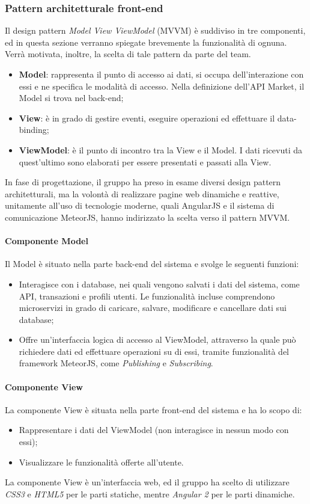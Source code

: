 \subsubsection{Pattern architetturale front-end}
Il design pattern \textit{Model View ViewModel} (MVVM) è suddiviso in tre componenti, ed in questa sezione verranno spiegate brevemente la funzionalità di ognuna. Verrà motivata, inoltre, la scelta di tale pattern da parte del team.

\begin{itemize}
	\item \textbf{Model}: rappresenta il punto di accesso ai dati, si occupa dell'interazione con essi e ne specifica le modalità di accesso. Nella definizione dell'API Market, il Model si trova nel back-end;
	\item \textbf{View}: è in grado di gestire eventi, eseguire operazioni ed effettuare il data-binding;
	\item \textbf{ViewModel}: è il punto di incontro tra la View e il Model. I dati ricevuti da quest’ultimo sono elaborati per essere presentati e passati alla View.
\end{itemize}

In fase di progettazione, il gruppo ha preso in esame diversi design pattern architetturali, ma la volontà di realizzare pagine web dinamiche e reattive, unitamente all'uso di tecnologie moderne, quali AngularJS e il sistema di comunicazione MeteorJS, hanno indirizzato la scelta verso il pattern MVVM.

\paragraph{Componente Model}
Il Model è situato nella parte back-end del sistema e svolge le seguenti funzioni:
\begin{itemize}
	\item Interagisce con i database, nei quali vengono salvati i dati del sistema, come API, transazioni e profili utenti. Le funzionalità incluse comprendono microservizi in grado di caricare, salvare, modificare e cancellare dati sui database;
	\item Offre un'interfaccia logica di accesso al ViewModel, attraverso la quale può richiedere dati ed effettuare operazioni su di essi, tramite funzionalità del framework MeteorJS, come \textit{Publishing} e \textit{Subscribing}.
\end{itemize}

\paragraph{Componente View}
La componente View è situata nella parte front-end del sistema e ha lo scopo di:
\begin{itemize}
	\item Rappresentare i dati del ViewModel (non interagisce in nessun modo con essi);
	\item Visualizzare le funzionalità offerte all'utente.
\end{itemize} 
La componente View è un'interfaccia web, ed il gruppo ha scelto di utilizzare \textit{CSS3} e \textit{HTML5} per le parti statiche, mentre \textit{Angular 2} per le parti dinamiche. 

